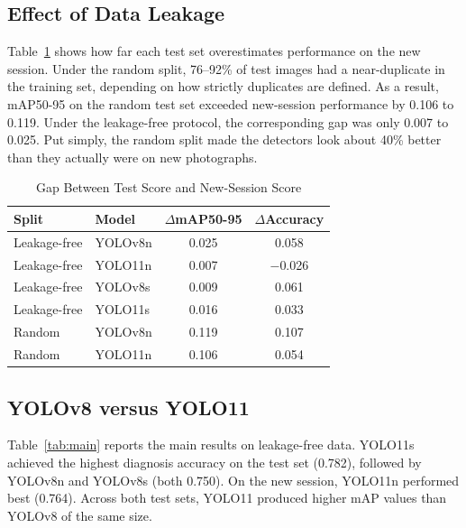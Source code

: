 \documentclass[conference,a4paper]{IEEEtran}
\begin{document}
\subsection{Effect of Data Leakage}
Table~\ref{tab:leak} shows how far each test set overestimates performance on the new session. Under the random split, 76--92\% of test images had a near-duplicate in the training set, depending on how strictly duplicates are defined. As a result, mAP50-95 on the random test set exceeded new-session performance by 0.106 to 0.119. Under the leakage-free protocol, the corresponding gap was only 0.007 to 0.025. Put simply, the random split made the detectors look about 40\% better than they actually were on new photographs.

\begin{table}[htbp]
\caption{Gap Between Test Score and New-Session Score}
\begin{center}
\setlength{\tabcolsep}{3pt}
\begin{tabular}{|l|l|c|c|}
\hline
\textbf{Split} & \textbf{Model} & \textbf{$\Delta$mAP50-95} & \textbf{$\Delta$Accuracy} \\
\hline
Leakage-free & YOLOv8n & 0.025 & 0.058 \\
Leakage-free & YOLO11n & 0.007 & $-$0.026 \\
Leakage-free & YOLOv8s & 0.009 & 0.061 \\
Leakage-free & YOLO11s & 0.016 & 0.033 \\
\hline
Random & YOLOv8n & 0.119 & 0.107 \\
Random & YOLO11n & 0.106 & 0.054 \\
\hline
\end{tabular}
\par\vspace{2pt}{\scriptsize Leakage-free: mean of three seeds. Random split: one seed.}
\label{tab:leak}
\end{center}
\end{table}

\subsection{YOLOv8 versus YOLO11}
Table~\ref{tab:main} reports the main results on leakage-free data. YOLO11s achieved the highest diagnosis accuracy on the test set (0.782), followed by YOLOv8n and YOLOv8s (both 0.750). On the new session, YOLO11n performed best (0.764). Across both test sets, YOLO11 produced higher mAP values than YOLOv8 of the same size.
\end{document}
